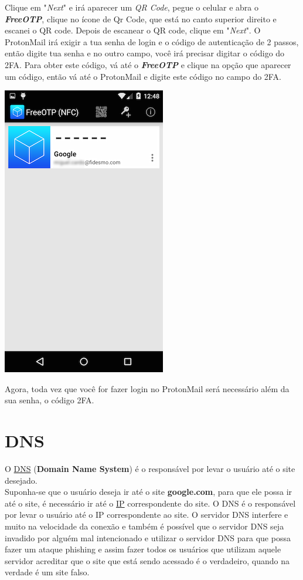 \documentclass[12pt, letterpaper, DejaVuSansMono:12]{report}
\begin{document}
	Clique em "\textit{Next}" e irá aparecer um \textit{QR Code}, pegue o celular e abra o \textit{\textbf{FreeOTP}}, clique no ícone de Qr Code, que está no canto superior direito e escanei o QR code. Depois de escanear o QR code, clique em "\textit{Next}". O ProtonMail irá exigir a tua senha de login e o código de autenticação de 2 passos, então digite tua senha e no outro campo, você irá precisar digitar o código do 2FA. Para obter este código, vá até o \textit{\textbf{FreeOTP}} e clique na opção que aparecer um código, então vá até o ProtonMail e digite este código no campo do 2FA.

	\begin{center}
		\includegraphics[scale=0.55]{FreeOTP.png}
	\end{center}

	Agora, toda vez que você for fazer login no ProtonMail será necessário além da sua senha, o código 2FA.

\pagebreak

\section{DNS}
	O \href{https://criptowiki.miraheze.org/wiki/DNS_(Domain_Name_System)}{DNS} (\textbf{Domain Name System}) é o responsável por levar o usuário até o site desejado.\\
	Suponha-se que o usuário deseja ir até o site \textbf{google.com}, para que ele possa ir até o site, é necessário ir até o \href{https://pt.wikipedia.org/wiki/IP}{IP} correspondente do site. O DNS é o responsável por levar o usuário até o IP correspondente ao site.
	O servidor DNS interfere e muito na velocidade da conexão e também é possível que o servidor DNS seja invadido por alguém mal intencionado e utilizar o servidor DNS para que possa fazer um ataque phishing e assim fazer todos os usuários que utilizam aquele servidor acreditar que o site que está sendo acessado é o verdadeiro, quando na verdade é um site falso.\\
\end{document}
